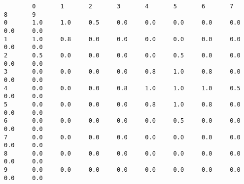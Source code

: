 \documentclass[a4paper,11pt]{article}
\begin{document}
\begin{enumerate}
\begin{lstlisting}
        0       1       2       3       4       5       6       7       8       9
0       1.0     1.0     0.5     0.0     0.0     0.0     0.0     0.0     0.0     0.0     
1       1.0     0.8     0.0     0.0     0.0     0.0     0.0     0.0     0.0     0.0
2       0.5     0.0     0.0     0.0     0.0     0.5     0.0     0.0     0.0     0.0
3       0.0     0.0     0.0     0.0     0.8     1.0     0.8     0.0     0.0     0.0
4       0.0     0.0     0.0     0.8     1.0     1.0     1.0     0.5     0.0     0.0
5       0.0     0.0     0.0     0.0     0.8     1.0     0.8     0.0     0.0     0.0
6       0.0     0.0     0.0     0.0     0.0     0.5     0.0     0.0     0.0     0.0
7       0.0     0.0     0.0     0.0     0.0     0.0     0.0     0.0     0.0     0.0
8       0.0     0.0     0.0     0.0     0.0     0.0     0.0     0.0     0.0     0.0
9       0.0     0.0     0.0     0.0     0.0     0.0     0.0     0.0     0.0     0.0
\end{lstlisting}
\end{enumerate}
\end{document}

